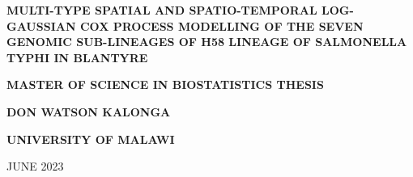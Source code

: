 \documentclass[12pt,a4paper]{report}
\begin{document}
	
	\begin{titlepage}
		
		
		
		
		
		
		\begin{large}
			\begin{center}
				\textbf{MULTI-TYPE SPATIAL AND SPATIO-TEMPORAL LOG-GAUSSIAN COX PROCESS MODELLING 
					OF THE SEVEN GENOMIC SUB-LINEAGES OF H58 LINEAGE OF SALMONELLA TYPHI IN BLANTYRE}\\
			\end{center}
		\end{large}
		\par \bigskip \bigskip \bigskip \bigskip \bigskip\bigskip \bigskip \bigskip
		
		
		\begin{large}
			\begin{center}
				\bf{MASTER OF SCIENCE IN BIOSTATISTICS THESIS}\\
			\end{center}
		\end{large}
		
		\par \bigskip \bigskip \bigskip \bigskip  \bigskip  \bigskip 
		
		\begin{large}
			\begin{center}
				\bf{DON WATSON KALONGA}\\
			\end{center}
		\end{large}
		
		\par \bigskip \bigskip \bigskip \bigskip \bigskip \bigskip \bigskip 
		
		\begin{large}
			\begin{center}
				\bf{UNIVERSITY OF MALAWI}\\
			\end{center}
		\end{large}
		
		\par \bigskip \bigskip
		
		\begin{large}
			\begin{center}
				JUNE 2023\\
			\end{center}
		\end{large}
		
	\end{titlepage}
	
\end{document}
